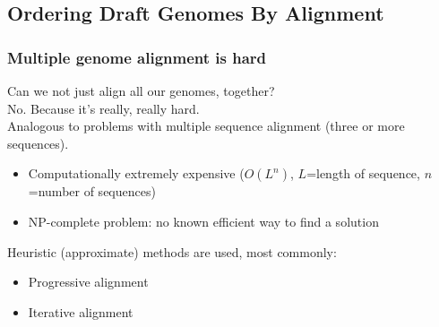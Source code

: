 \subsection{Ordering Draft Genomes By Alignment}

\begin{frame}
  \frametitle{Multiple genome alignment is hard}
  Can we not just align all our genomes, together?\\[0.1cm]
  No. Because it's really, really hard.\\[0.1cm]
  Analogous to problems with multiple sequence alignment (three or more sequences).
  \begin{itemize}
    \item Computationally extremely expensive ($O(L^n)$, $L$=length of sequence, $n$=number of sequences) 
    \item NP-complete problem: no known efficient way to find a solution
  \end{itemize}
  Heuristic (approximate) methods are used, most commonly:
  \begin{itemize}
    \item Progressive alignment
    \item Iterative alignment
  \end{itemize}
\end{frame}

